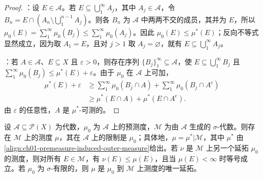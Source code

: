 \documentclass[../../main.tex]{subfiles}%
\begin{document}
\begin{proof}
：设 $E\in\mathscr{A}$。若 $E\subseteq\bigcup_1^\infty A_j$，其中 $A_j\in\mathscr{A}$，令 $B_n=E\cap(A_n\setminus\bigcup_1^{n-1}A_j)$。则各 $B_n$ 为 $\mathscr{A}$ 中两两不交的成员，其并为 $E$，所以 $\mu_0(E)=\sum_1^\infty\mu_0(B_j)\leqslant\sum_1^\infty\mu_0(A_j)$。因此 $\mu_0(E)\leqslant\mu^*(E)$；反向不等式显然成立，因为取 $A_1=E$，且对 $j>1$ 取 $A_j=\varnothing$，就有 $E\subseteq\bigcup_1^\infty A_j$。

：若 $A\in\mathscr{A}$、$E\subseteq X$ 且 $\varepsilon>0$，则存在序列 $\{B_j\}_1^\infty\subseteq\mathscr{A}$，使 $E\subseteq\bigcup_1^\infty B_j$ 且 $\sum_1^\infty\mu_0(B_j)\leqslant\mu^*(E)+\varepsilon$。由于 $\mu_0$ 在 $\mathscr{A}$ 上可加，
\begin{align*}
\mu^*(E)+\varepsilon&\geqslant\sum_1^\infty\mu_0(B_j\cap A)+\sum_1^\infty\mu_0(B_j\cap A^{\mathrm{c}})\\
&\geqslant\mu^*(E\cap A)+\mu^*(E\cap A^{\mathrm{c}}).
\end{align*}
由 $\varepsilon$ 的任意性，$A$ 是 $\mu^*$-可测的。
\end{proof}

\begin{theorem}\label{theorem:ch01-measure-extension}
设 $\mathscr{A}\subseteq\mathscr{P}(X)$ 为代数，$\mu_0$ 为 $\mathscr{A}$ 上的预测度，$\mathscr{M}$ 为由 $\mathscr{A}$ 生成的 $\sigma$-代数。则存在 $\mathscr{M}$ 上的测度 $\mu$，其在 $\mathscr{A}$ 上的限制是 $\mu_0$；具体地，$\mu=\mu^*|\mathscr{M}$，其中 $\mu^*$ 由\eqref{align:ch01-premeasure-induced-outer-measure}给出。若 $\nu$ 是 $\mathscr{M}$ 上另一个延拓 $\mu_0$ 的测度，则对所有 $E\in\mathscr{M}$，有 $\nu(E)\leqslant\mu(E)$，且当 $\mu(E)<\infty$ 时等号成立。若 $\mu_0$ 为 $\sigma$-有限的，则 $\mu$ 是 $\mu_0$ 到 $\mathscr{M}$ 上测度的唯一延拓。
\end{theorem}
\end{document}
